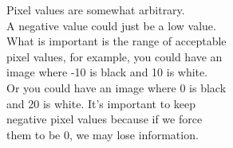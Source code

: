 Pixel values are somewhat arbitrary.\\
A negative value could just be a low value.\\
What is important is the range of acceptable \\
pixel values, for example, you could have an\\
image where -10 is black and 10 is white.\\
Or you could have an image where 0 is black \\
and 20 is white.  It's important to keep \\
negative pixel values because if we force \\
them to be 0, we may lose information.
